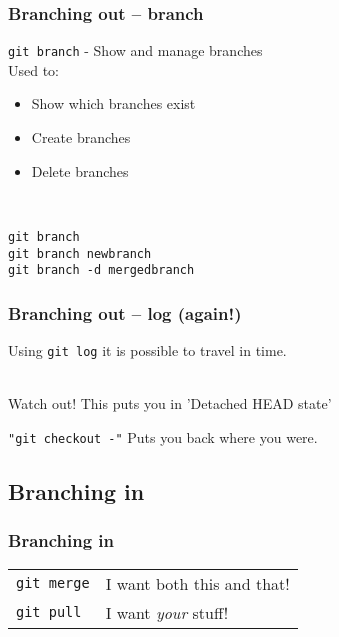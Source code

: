 \documentclass{beamer}
\begin{document}
\begin{frame}
  \frametitle{Branching out -- branch}

    \texttt{git branch} - Show and manage branches \\[1em]
    Used to:
    \begin{itemize}
        \item<1-> Show which branches exist
        \item<2-> Create branches
        \item<3-> Delete branches
    \end{itemize} \\[1em]

    \pause[4]

    \texttt{git branch} \\
    \texttt{git branch newbranch} \\
    \texttt{git branch -d mergedbranch}
\end{frame}

\begin{frame}
  \frametitle{Branching out -- log (again!)}

    Using \texttt{git log} it is possible to travel in time. \\[1em]

     \\[3em]

    \pause[3]

    \alert{Watch out! This puts you in 'Detached HEAD state'} \\[1em]

    \pause

    \texttt{"git checkout -"} Puts you back where you were.

\end{frame}

\subsection{Branching in}

\begin{frame}[fragile]
  \frametitle{Branching in}

  \begin{tabular}{ll}
    \texttt{git merge} & I want both this and that! \\
    \texttt{git pull} & I want \emph{your} stuff! \\
  \end{tabular}

\end{frame}
\end{document}
